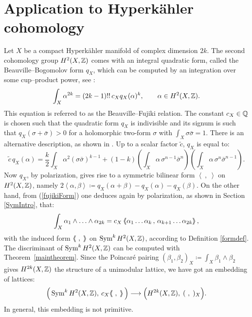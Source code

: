 \section{Application to Hyperk\"ahler cohomology} \label{hyper}
Let $X$ be a compact Hyperk\"ahler manifold of complex dimension $2k$. The second cohomology group $H^2(X,\mathbb{Z})$ comes with an integral quadratic form, called the Beauville--Bogomolov form $q_X$, which can be computed by an integration over some cup--product power, see \cite[Subsection~2.3]{OGrady}:
\begin{equation} \label{fujikiForm}
\int_X \alpha ^{2k} = (2k-1)!!\,c_X q_X(\alpha)^k,\qquad \alpha\in H^2(X,\mathbb{Z}).
\end{equation}
This equation is referred to as the Beauville--Fujiki relation. The constant $c_X\in\mathbb{Q}$ is chosen such that the quadratic form $q_X$ is indivisible and its signum is such that $q_X(\sigma + \bar{\sigma}) > 0$ for a holomorphic two-form $\sigma$ with $\int_X\sigma\bar{\sigma} = 1$. There is an alternative description, as shown in \cite[Chap.~23]{Huybrechts}. Up to a scalar factor $\tilde{c}$, $q_X$ is equal to:
\begin{equation}\label{bb}
 \tilde{c}\,q_X(\alpha) = \frac{k}{2}\int_X \alpha^2 (\sigma\bar{\sigma})^{k-1} + (1-k)\left(\int_X\alpha\,\sigma^{n-1}\bar{\sigma}^{n}\right)\left(\int_X\alpha\,\sigma^{n}\bar{\sigma}^{n-1}\right).
\end{equation}
Now $q_X$, by polarization, gives rise to a symmetric bilinear form $\left<\ ,\;\right>$ on $H^2(X,\mathbb{Z})$, namely $2\left<\alpha,\beta\right> \coloneqq q_X(\alpha+\beta)-q_X(\alpha) -q_X(\beta)$. On the other hand, from (\ref{fujikiForm}) one deduces again by polarization, as shown in Section \ref{SymIntro}, that:
\begin{equation}
 \int_X \alpha_1\wedge\ldots\wedge\alpha_{2k} = c_X \left<\!\!\!\:\left< \alpha_1\ldots\alpha_k\,,\,\alpha_{k+1}\ldots\alpha_{2k}\right>\!\!\!\:\right>,
\end{equation}
with the induced form $\left<\!\!\!\:\left<\ ,\;\right>\!\!\!\:\right>$ on $\operatorname{Sym}^kH^2(X,\mathbb{Z})$, according to Definition \ref{formdef}. The discriminant of $\operatorname{Sym}^kH^2(X,\mathbb{Z})$ can be computed with Theorem~\ref{maintheorem}. Since the Poincar\'e pairing $(\beta_1,\beta_2)_X \coloneqq \int_X\beta_1\wedge\beta_2$ gives $H^{2k}(X,\mathbb{Z})$ the structure of a unimodular lattice, we have got an embedding of lattices:
\begin{equation}
\Big( \operatorname{Sym}^kH^2(X,\mathbb{Z}),\: c_X\!\left<\!\!\!\:\left<\ ,\;\right>\!\!\!\:\right>\Big) \longrightarrow \Big(H^{2k}(X,\mathbb{Z}),\;(\ ,\;)_X\Big).
\end{equation}
In general, this embedding is not primitive.

